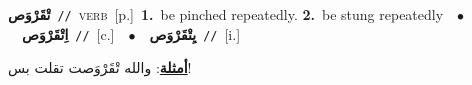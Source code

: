 \documentclass[10pt,a4paper,twoside]{article} %
\begin{document}
\begin{multicols}{2}
{\setlength\topsep{0pt}\textbf{\foreignlanguage{arabic}{تْقَرْوَص}}\ {\color{gray}\texttt{//}\color{black}}\ \textsc{verb}\ [p.]\ \textbf{1.}~be pinched repeatedly.  \textbf{2.}~be stung repeatedly\ \ $\bullet$\ \ \setlength\topsep{0pt}\textbf{\foreignlanguage{arabic}{اِتْقَرْوَص}}\ {\color{gray}\texttt{//}\color{black}}\ [c.]\ \ $\bullet$\ \ \setlength\topsep{0pt}\textbf{\foreignlanguage{arabic}{يِتْقَرْوَص}}\ {\color{gray}\texttt{//}\color{black}}\ [i.]\  \begin{flushright}\color{gray}\foreignlanguage{arabic}{\textbf{\underline{\foreignlanguage{arabic}{أمثلة}}}: والله تْقَرْوَصت تقلت بس!}\end{flushright}\color{black}} \vspace{2mm}


\end{multicols}
\end{document}

